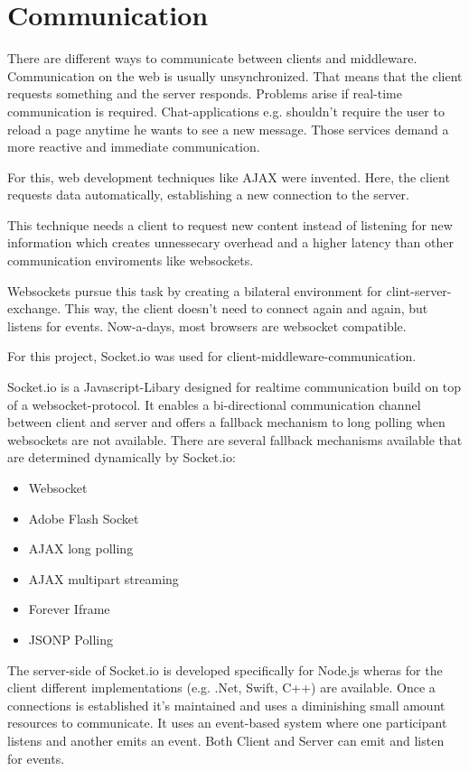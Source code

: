 \section{Communication}
There are different ways to communicate between clients and middleware. 
Communication on the web is usually unsynchronized. 
That means that the client requests something and the server responds. 
Problems arise if real-time communication is required. 
Chat-applications e.g. shouldn't require the user to reload a page anytime he wants to see a new message.
Those services demand a more reactive and immediate communication.

For this, web development techniques like AJAX \parencite{ajax} were invented. 
Here, the client requests data automatically, establishing a new connection to the server.

This technique needs a client to request new content instead of listening 
for new information which creates unnessecary overhead and a higher latency than other communication enviroments like websockets.  
 
Websockets pursue this task by creating a bilateral environment for clint-server-exchange. 
This way, the client doesn't need to connect again and again, but listens for events. 
Now-a-days, most browsers are websocket compatible.

For this project, Socket.io was used for client-middleware-communication.

Socket.io is a Javascript-Libary designed for realtime communication build on top of a websocket-protocol.
It enables a bi-directional communication channel between client and server and offers a fallback mechanism to long polling when websockets are not available.
There are several fallback mechanisms available that are determined dynamically by Socket.io:
\begin{itemize}
    \item Websocket
    \item Adobe Flash Socket
    \item AJAX long polling
    \item AJAX multipart streaming
    \item Forever Iframe
    \item JSONP Polling
\end{itemize}

The server-side of Socket.io is developed  specifically for Node.js wheras for the client different implementations (e.g. .Net, Swift, C++)\parencite{socketioClients} are available.
Once a connections is established it's maintained and uses a diminishing small amount resources to communicate. 
It uses an event-based system where one participant listens and another emits an event. 
Both Client and Server can emit and listen for events.

